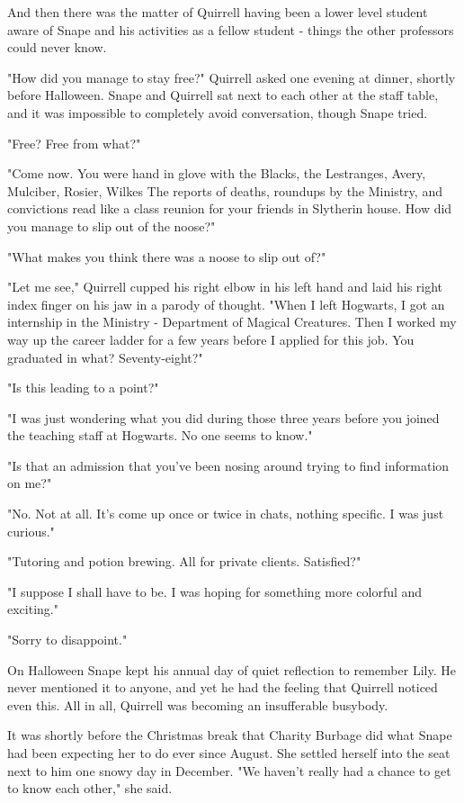 And then there was the matter of Quirrell having been a lower level student aware of Snape and his activities as a fellow student - things the other professors could never know.

"How did you manage to stay free?" Quirrell asked one evening at dinner, shortly before Halloween. Snape and Quirrell sat next to each other at the staff table, and it was impossible to completely avoid conversation, though Snape tried.

"Free? Free from what?"

"Come now. You were hand in glove with the Blacks, the Lestranges, Avery, Mulciber, Rosier, Wilkes{\el} The reports of deaths, roundups by the Ministry, and convictions read like a class reunion for your friends in Slytherin house. How did you manage to slip out of the noose?"

"What makes you think there was a noose to slip out of?"

"Let me see," Quirrell cupped his right elbow in his left hand and laid his right index finger on his jaw in a parody of thought. "When I left Hogwarts, I got an internship in the Ministry - Department of Magical Creatures. Then I worked my way up the career ladder for a few years before I applied for this job. You graduated in what? Seventy-eight?"

"Is this leading to a point?"

"I was just wondering what you did during those three years before you joined the teaching staff at Hogwarts. No one seems to know."

"Is that an admission that you've been nosing around trying to find information on me?"

"No. Not at all. It's come up once or twice in chats, nothing specific. I was just curious."

"Tutoring and potion brewing. All for private clients. Satisfied?"

"I suppose I shall have to be. I was hoping for something more colorful and exciting."

"Sorry to disappoint."

On Halloween Snape kept his annual day of quiet reflection to remember Lily. He never mentioned it to anyone, and yet he had the feeling that Quirrell noticed even this. All in all, Quirrell was becoming an insufferable busybody.

It was shortly before the Christmas break that Charity Burbage did what Snape had been expecting her to do ever since August. She settled herself into the seat next to him one snowy day in December. "We haven't really had a chance to get to know each other," she said.

